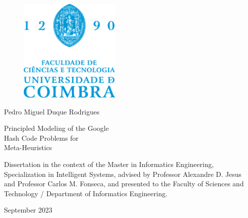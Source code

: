 \begin{cover}
  \vspace*{\fill}

  \begin{figure}[h!]
    \centering
    \includegraphics[height=5cm, keepaspectratio]{../assets/cover/fctuc-logo.eps}
  \end{figure}

  \vspace{\fill}

  \large{Pedro Miguel Duque Rodrigues}

  \vspace*{\fill}

  \LARGE{\sffamily Principled Modeling of the Google \\ Hash Code Problems for \\ Meta-Heuristics}

  \vspace*{\fill}

  \normalsize{
    Dissertation in the context of the Master in Informatics Engineering,
    Specialization in Intelligent Systems, advised by Professor Alexandre D. Jesus
    and Professor Carlos M. Fonseca, and presented to the Faculty of
    Sciences and Technology / Department of Informatics Engineering.
  }

  \vspace{\fill}

  \normalsize{\centering September 2023}

  \vspace*{\fill}
\end{cover}